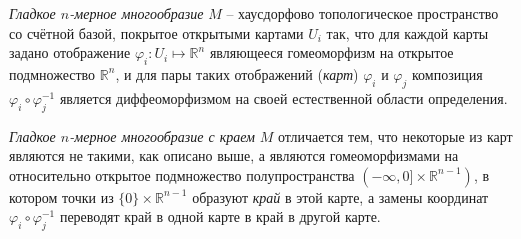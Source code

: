 \begin{to_def}
     \textit{Гладкое $n$-мерное многообразие} $M$ -- хаусдорфово топологическое пространство со счётной базой, покрытое открытыми картами $U_i$ так, что для каждой карты задано отображение $\varphi_i \colon U_i \mapsto \mathbb{R}^n$ являющееся гомеоморфизм на открытое подмножество $\mathbb{R}^n$, и для пары таких отображений (\textit{карт}) $\varphi_i$ и $\varphi_j$ композиция $\varphi_i \circ \varphi_j^{-1}$ является диффеоморфизмом на своей естественной области определения.
\end{to_def}

\begin{to_def} 
     \textit{Гладкое $n$-мерное многообразие с краем} $M$ отличается тем, что некоторые из карт являются не такими, как описано выше, а являются гомеоморфизмами на относительно открытое подмножество полупространства $(-\infty, 0] \times \mathbb{R}^{n-1})$, в котором точки из $\{0\}\times \mathbb{R}^{n-1}$ образуют \textit{край} в этой карте, а замены координат $\varphi_i \circ \varphi_j^{-1}$ переводят край в одной карте в край в другой карте.
\end{to_def}

